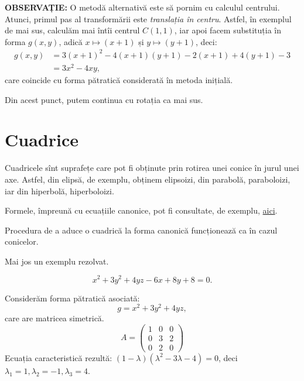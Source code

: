 \textbf{OBSERVAȚIE:} O metodă alternativă este să pornim cu calculul centrului.
Atunci, primul pas al transformării este \emph{translația în centru}.
Astfel, în exemplul de mai sus, calculăm mai întîi centrul $ C(1, 1) $,
iar apoi facem substituția în forma $ g(x, y) $, adică $ x \mapsto (x + 1) $
și $ y \mapsto (y + 1) $, deci:
\begin{align*}
    g(x, y) &= 3(x + 1)^2 - 4(x + 1)(y + 1) - 2(x + 1) + 4(y + 1) - 3 \\
            &= 3x^2 - 4xy,
\end{align*}
care coincide cu forma pătratică considerată în metoda inițială.

Din acest punct, putem continua cu rotația ca mai sus.


\section{Cuadrice}

Cuadricele sînt suprafețe care pot fi obținute prin rotirea unei conice în jurul
unei axe. Astfel, din elipsă, de exemplu, obținem elipsoizi, din parabolă,
paraboloizi, iar din hiperbolă, hiperboloizi.

Formele, împreună cu ecuațiile canonice, pot fi consultate, de exemplu,
\href{https://en.wikipedia.org/wiki/Quadric#Euclidean_space}{aici}.

Procedura de a aduce o cuadrică la forma canonică funcționează ca în cazul
conicelor.

Mai jos un exemplu rezolvat.

\[
  x^2 + 3y^2 + 4yz - 6x + 8y + 8 = 0.
\]

Considerăm forma pătratică asociată:
\[
  g = x^2 + 3y^2 + 4yz,
\]
care are matricea simetrică.
\[
  A = \begin{pmatrix}
    1 & 0 & 0 \\
    0 & 3 & 2 \\
    0 & 2 & 0
  \end{pmatrix}
\]
Ecuația caracteristică rezultă: $(1 - \lambda)(\lambda^2 - 3\lambda - 4) = 0$,
deci $\lambda_1 = 1, \lambda_2 = -1, \lambda_3 = 4$.

